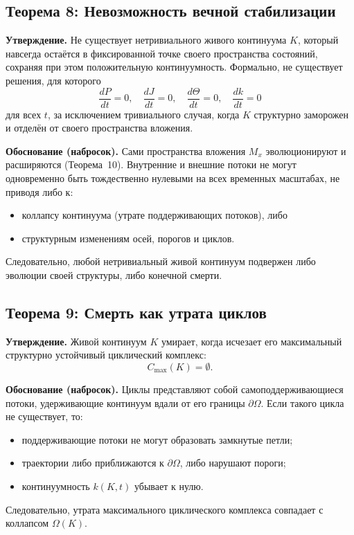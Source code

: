 \subsection{Теорема 8: Невозможность вечной стабилизации}
\label{thm:no-eternal-stabilisation}

\textbf{Утверждение.}
Не существует нетривиального живого континуума \(K\), который навсегда остаётся в фиксированной точке своего пространства состояний, сохраняя при этом положительную континуумность.
Формально, не существует решения, для которого
\[
    \frac{dP}{dt} = 0, \quad \frac{dJ}{dt} = 0, \quad \frac{d\Theta}{dt} = 0, \quad \frac{dk}{dt} = 0
\]
для всех \(t\), за исключением тривиального случая, когда \(K\) структурно заморожен и отделён от своего пространства вложения.

\textbf{Обоснование (набросок).}
Сами пространства вложения \(M_x\) эволюционируют и расширяются (Теорема~10).
Внутренние и внешние потоки не могут одновременно быть тождественно нулевыми на всех временных масштабах, не приводя либо к:
\begin{itemize}
    \item коллапсу континуума (утрате поддерживающих потоков), либо
    \item структурным изменениям осей, порогов и циклов.
\end{itemize}
Следовательно, любой нетривиальный живой континуум подвержен либо эволюции своей структуры, либо конечной смерти.

\subsection{Теорема 9: Смерть как утрата циклов}

\textbf{Утверждение.}
Живой континуум \(K\) умирает, когда исчезает его максимальный структурно устойчивый циклический комплекс:
\[
    C_{\max}(K) = \emptyset.
\]

\textbf{Обоснование (набросок).}
Циклы представляют собой самоподдерживающиеся потоки, удерживающие континуум вдали от его границы \(\partial\Omega\).
Если такого цикла не существует, то:
\begin{itemize}
    \item поддерживающие потоки не могут образовать замкнутые петли;
    \item траектории либо приближаются к \(\partial\Omega\), либо нарушают пороги;
    \item континуумность \(k(K,t)\) убывает к нулю.
\end{itemize}
Следовательно, утрата максимального циклического комплекса совпадает с коллапсом \(\Omega(K)\).

